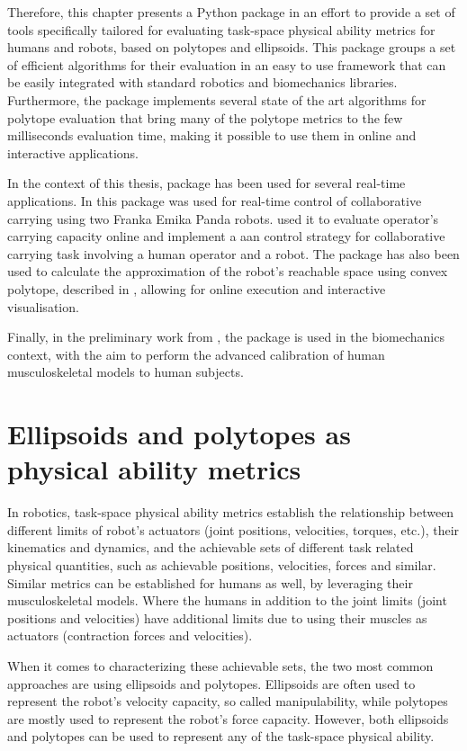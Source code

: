 Therefore, this chapter presents a Python  package in an effort to provide a set of tools specifically tailored for evaluating task-space physical ability metrics for humans and robots, based on polytopes and ellipsoids. This package groups a set of efficient algorithms for their evaluation in an easy to use framework that can be easily integrated with standard robotics and biomechanics libraries. Furthermore, the package implements several state of the art algorithms for polytope evaluation that bring many of the polytope metrics to the few milliseconds evaluation time, making it possible to use them in online and interactive applications. 

In the context of this thesis,  package has been used for several real-time applications. In  this package was used for real-time control of collaborative carrying using two Franka Emika Panda robots.  used it to evaluate operator's carrying capacity online and implement a \gls{aan} control strategy for collaborative carrying task involving a human operator and a robot. The package has also been used to calculate the approximation of the robot's reachable space using convex polytope, described in , allowing for online execution and interactive visualisation.

Finally, in the preliminary work from  \citet{laisne2023Genetic}, the package is used in the biomechanics context, with the aim to perform the advanced calibration of human musculoskeletal models to human subjects.

\section{Ellipsoids and polytopes as physical ability metrics}
\label{sec:pycapacity_ellip_poly}
In robotics, task-space physical ability metrics establish the relationship between different limits of robot's actuators (joint positions, velocities, torques, etc.), their kinematics and dynamics, and the achievable sets of different task related physical quantities, such as achievable positions, velocities, forces and similar. Similar metrics can be established for humans as well, by leveraging their musculoskeletal models. Where the humans in addition to the joint limits (joint positions and velocities) have additional limits due to using their muscles as actuators (contraction forces and velocities).

When it comes to characterizing these achievable sets, the two most common approaches are using ellipsoids and polytopes. Ellipsoids are often used to represent the robot's velocity capacity, so called manipulability, while polytopes are mostly used to represent the robot's force capacity. However, both ellipsoids and polytopes can be used to represent any of the task-space physical ability.

